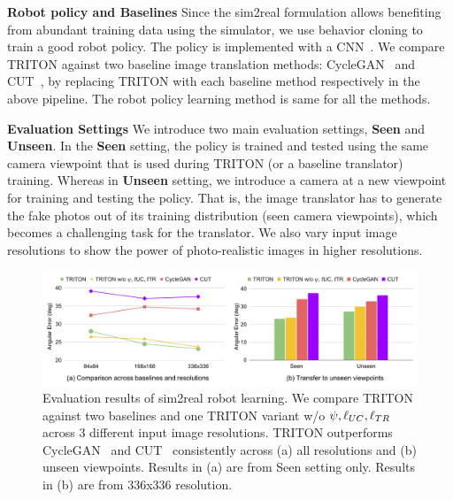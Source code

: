 \documentclass{article}
\begin{document}
\textbf{Robot policy and Baselines}
Since the sim2real formulation allows benefiting from abundant training data using the simulator, we use behavior cloning to train a good robot policy.
The policy is implemented with a CNN~\cite{dqn}.
We compare TRITON against two baseline image translation methods: CycleGAN~\cite{cyclegan} and CUT~\cite{cut}, by replacing TRITON with each baseline method respectively in the above pipeline. The robot policy learning method is same for all the methods.

\textbf{Evaluation Settings} We introduce two main evaluation settings, \textbf{Seen} and \textbf{Unseen}. In the \textbf{Seen} setting, the policy is trained and tested using the same camera viewpoint that is used during TRITON (or a baseline translator) training. Whereas in \textbf{Unseen} setting, we introduce a camera at a new viewpoint for training and testing the policy. That is, the image translator has to generate the fake photos out of its training distribution (seen camera viewpoints), which becomes a challenging task for the translator. We also vary input image resolutions to show the power of photo-realistic images in higher resolutions.

\begin{figure}[tbhp]
    \centering
    \vspace{-3pt}
    \includegraphics[width=\textwidth]{../images/sim2real_res.pdf}
    \vspace{-5pt}
    \caption{Evaluation results of sim2real robot learning. We compare TRITON against two baselines and one TRITON variant w/o $\psi,\ell_{UC},\ell_{TR}$ across 3 different input image resolutions. TRITON outperforms CycleGAN~\cite{cyclegan} and CUT~\cite{cut} consistently across (a) all resolutions and (b) unseen viewpoints. Results in (a) are from Seen setting only. Results in (b) are from 336x336 resolution. }
    \label{fig:sim2real}
    \vspace{-3pt}
\end{figure}
\end{document}
